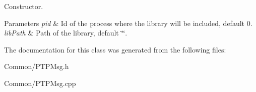 Constructor. 


\begin{DoxyParams}{Parameters}
{\em pid} & Id of the process where the library will be included, default 0. \\
\hline
{\em lib\-Path} & Path of the library, default \char`\"{}\char`\"{}. \\
\hline
\end{DoxyParams}


The documentation for this class was generated from the following files\-:\begin{DoxyCompactItemize}
\item 
Common/P\-T\-P\-Msg.\-h\item 
Common/P\-T\-P\-Msg.\-cpp\end{DoxyCompactItemize}
